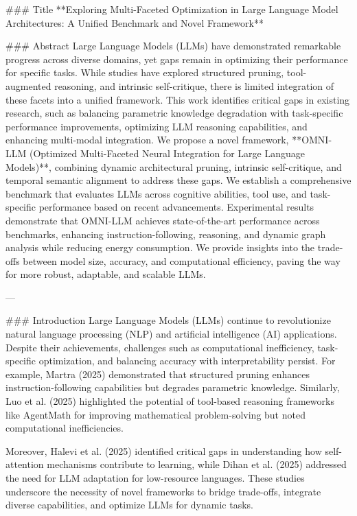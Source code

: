 ### Title  
**Exploring Multi-Faceted Optimization in Large Language Model Architectures: A Unified Benchmark and Novel Framework**

### Abstract  
Large Language Models (LLMs) have demonstrated remarkable progress across diverse domains, yet gaps remain in optimizing their performance for specific tasks. While studies have explored structured pruning, tool-augmented reasoning, and intrinsic self-critique, there is limited integration of these facets into a unified framework. This work identifies critical gaps in existing research, such as balancing parametric knowledge degradation with task-specific performance improvements, optimizing LLM reasoning capabilities, and enhancing multi-modal integration. We propose a novel framework, **OMNI-LLM (Optimized Multi-Faceted Neural Integration for Large Language Models)**, combining dynamic architectural pruning, intrinsic self-critique, and temporal semantic alignment to address these gaps. We establish a comprehensive benchmark that evaluates LLMs across cognitive abilities, tool use, and task-specific performance based on recent advancements. Experimental results demonstrate that OMNI-LLM achieves state-of-the-art performance across benchmarks, enhancing instruction-following, reasoning, and dynamic graph analysis while reducing energy consumption. We provide insights into the trade-offs between model size, accuracy, and computational efficiency, paving the way for more robust, adaptable, and scalable LLMs.

---

### Introduction  
Large Language Models (LLMs) continue to revolutionize natural language processing (NLP) and artificial intelligence (AI) applications. Despite their achievements, challenges such as computational inefficiency, task-specific optimization, and balancing accuracy with interpretability persist. For example, Martra (2025) demonstrated that structured pruning enhances instruction-following capabilities but degrades parametric knowledge. Similarly, Luo et al. (2025) highlighted the potential of tool-based reasoning frameworks like AgentMath for improving mathematical problem-solving but noted computational inefficiencies.

Moreover, Halevi et al. (2025) identified critical gaps in understanding how self-attention mechanisms contribute to learning, while Dihan et al. (2025) addressed the need for LLM adaptation for low-resource languages. These studies underscore the necessity of novel frameworks to bridge trade-offs, integrate diverse capabilities, and optimize LLMs for dynamic tasks.

